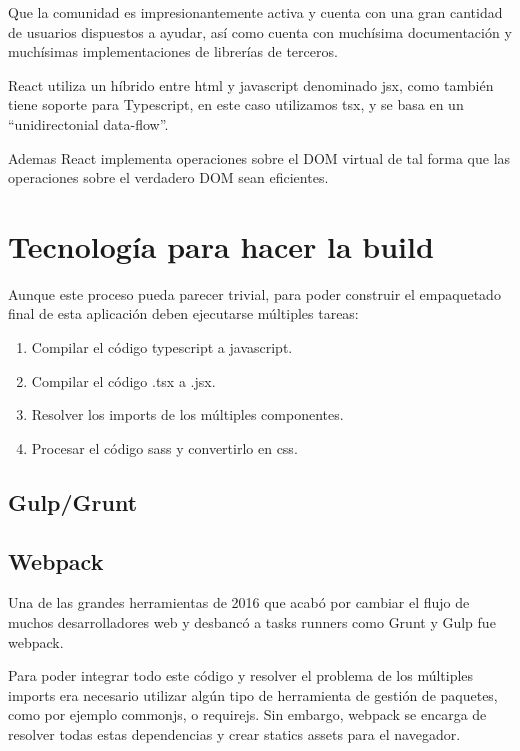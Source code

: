 \bigskip
Que la comunidad es impresionantemente activa y cuenta con una gran cantidad de usuarios dispuestos a ayudar, así como cuenta con muchísima documentación y muchísimas implementaciones de librerías de terceros.

\bigskip
React utiliza un híbrido entre html y javascript denominado jsx, como también tiene soporte para 
Typescript, en este caso utilizamos tsx, y se basa en un “unidirectonial data-flow”. 

\bigskip
Ademas React implementa operaciones sobre el DOM virtual de tal forma que las operaciones sobre
el verdadero DOM sean eficientes.

\section{Tecnología para hacer la build}
\label{3:sec3}

Aunque este proceso pueda parecer trivial, para poder construir el empaquetado final de esta aplicación
deben ejecutarse múltiples tareas:

\begin{enumerate}

\item Compilar el código typescript a javascript.

\item Compilar el código .tsx a .jsx.

\item Resolver los imports de los múltiples componentes.

\item Procesar el código sass y convertirlo en css.

\end{enumerate}

\subsection{Gulp/Grunt}



\subsection{Webpack}
\bigskip
Una de las grandes herramientas de 2016 que acabó por cambiar el flujo de muchos 
desarrolladores web y desbancó a tasks runners como Grunt y Gulp fue webpack.

\bigskip
Para poder integrar todo este código y resolver el problema de los múltiples imports 
era necesario utilizar algún tipo de herramienta de gestión de paquetes, como por ejemplo 
commonjs, o requirejs. Sin embargo, webpack se encarga de resolver todas estas 
dependencias y crear statics assets para el navegador.

